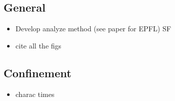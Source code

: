 \subsection*{General}
\begin{itemize}
	\item Develop analyze method (see paper for EPFL) SF
	\item cite all the figs
\end{itemize}

\subsection*{Confinement}
\begin{itemize}
	\item charac times
\end{itemize}
